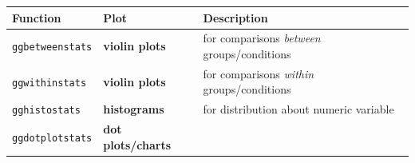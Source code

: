 \documentclass[
]{article}
\begin{document}
\begin{longtable}[]{@{}lll@{}}
\toprule
\begin{minipage}[b]{0.17\columnwidth}\raggedright
Function\strut
\end{minipage} & \begin{minipage}[b]{0.25\columnwidth}\raggedright
Plot\strut
\end{minipage} & \begin{minipage}[b]{0.49\columnwidth}\raggedright
Description\strut
\end{minipage}\tabularnewline
\midrule
\endhead
\begin{minipage}[t]{0.17\columnwidth}\raggedright
\texttt{ggbetweenstats}\strut
\end{minipage} & \begin{minipage}[t]{0.25\columnwidth}\raggedright
\textbf{violin plots}\strut
\end{minipage} & \begin{minipage}[t]{0.49\columnwidth}\raggedright
for comparisons \emph{between} groups/conditions\strut
\end{minipage}\tabularnewline
\begin{minipage}[t]{0.17\columnwidth}\raggedright
\texttt{ggwithinstats}\strut
\end{minipage} & \begin{minipage}[t]{0.25\columnwidth}\raggedright
\textbf{violin plots}\strut
\end{minipage} & \begin{minipage}[t]{0.49\columnwidth}\raggedright
for comparisons \emph{within} groups/conditions\strut
\end{minipage}\tabularnewline
\begin{minipage}[t]{0.17\columnwidth}\raggedright
\texttt{gghistostats}\strut
\end{minipage} & \begin{minipage}[t]{0.25\columnwidth}\raggedright
\textbf{histograms}\strut
\end{minipage} & \begin{minipage}[t]{0.49\columnwidth}\raggedright
for distribution about numeric variable\strut
\end{minipage}\tabularnewline
\begin{minipage}[t]{0.17\columnwidth}\raggedright
\texttt{ggdotplotstats}\strut
\end{minipage} & \begin{minipage}[t]{0.25\columnwidth}\raggedright
\textbf{dot plots/charts}\strut
\end{minipage} & \begin{minipage}[t]{0.49\columnwidth}\raggedright

\end{minipage}
\end{longtable}
\end{document}
